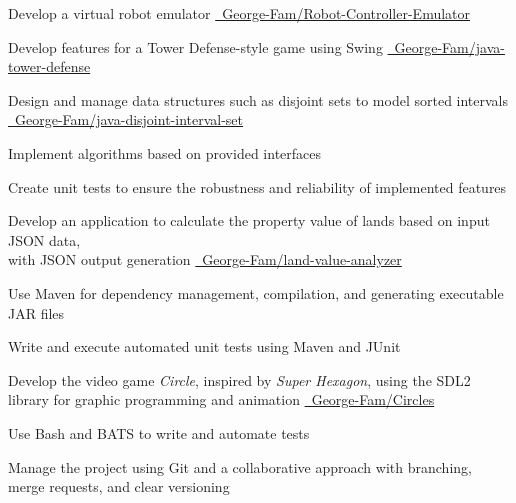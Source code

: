 \documentclass[letterpaper,10pt]{article}
\begin{document}
  \begin{resume_list}
    \item Develop a virtual robot emulator {\small \href{https://github.com/George-Fam/Robot-Controller-Emulator}{\faGithubSquare\ George-Fam/Robot-Controller-Emulator}}
    \vspace{2pt}
    \item Develop features for a Tower Defense-style game using Swing {\small \href{https://github.com/George-Fam/java-tower-defense}{\faGithubSquare\ George-Fam/java-tower-defense}}
    \vspace{2pt}
    \item Design and manage data structures such as disjoint sets to model sorted intervals {\small \href{https://github.com/George-Fam/java-disjoint-interval-set}{\faGithubSquare\ George-Fam/java-disjoint-interval-set}}
    \vspace{2pt}
    \item Implement algorithms based on provided interfaces
    \vspace{2pt}
    \item Create unit tests to ensure the robustness and reliability of implemented features
  \end{resume_list}

  \begin{resume_list}
    \item Develop an application to calculate the property value of lands based on input JSON data,\\ with JSON output generation {\small \href{https://github.com/George-Fam/land-value-analyzer}{\faGithubSquare\ George-Fam/land-value-analyzer}}
    \vspace{2pt}
    \item Use Maven for dependency management, compilation, and generating executable JAR files
    \vspace{2pt}
    \item Write and execute automated unit tests using Maven and JUnit
  \end{resume_list}
  
  \begin{resume_list}
    \item Develop the video game \textit{Circle}, inspired by \textit{Super Hexagon}, using the SDL2 library for graphic programming and animation {\small \href{https://github.com/George-Fam/Circles}{\faGithubSquare\ George-Fam/Circles}}
    \vspace{2pt}
    \item Use Bash and BATS to write and automate tests
    \vspace{2pt}
    \item Manage the project using Git and a collaborative approach with branching, merge requests, and clear versioning
  \end{resume_list}
\end{document}
